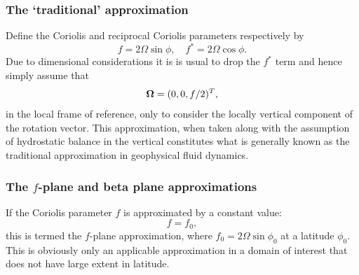 
\subsubsection{The `traditional' approximation}
Define the Coriolis and reciprocal Coriolis parameters \citep{cushman1994} respectively by
\begin{equation}\label{eq:coriolis_parameters} 
f=2\Omega\sin\phi,\quad f^*=2\Omega\cos\phi.
\end{equation}
Due to dimensional considerations it is is usual to
drop the $f^*$ term and hence simply assume that 
\begin{equation}\label{eq:f_omega}
{\mbox{\boldmath$\Omega$}}=(0,0,f/2)^T,
\end{equation}
in the local frame of reference, \ie only to consider the locally vertical
component of the rotation vector.
This approximation, when taken along with the assumption of hydrostatic balance in the
vertical constitutes what is generally known as the traditional approximation in geophysical fluid
dynamics.


\subsubsection{The $f$-plane and beta plane approximations}
If the Coriolis parameter $f$ is approximated by a constant value:
\begin{equation}\label{eq:f-plane}
f=f_0,
\end{equation}
this is termed the $f$-plane approximation, 
where $f_0 = 2\Omega\sin\phi_0$ at a latitude $\phi_0$.
This is obviously only an applicable approximation in a domain of interest 
that does not have large extent in latitude. 

